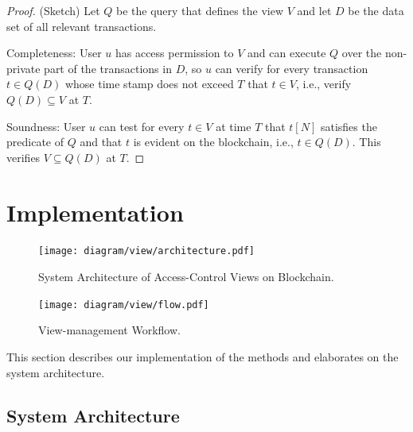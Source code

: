\begin{proof} (Sketch)
Let $Q$ be the query that defines the view $V$ and let $D$ be the data set of all relevant transactions. 

Completeness: User $u$ has access permission to $V$ and can execute $Q$ over the non-private part of the transactions in $D$, so $u$ can verify for every transaction $t\in Q(D)$ whose time stamp does not exceed $T$ that $t\in V$, i.e., verify $Q(D)\subseteq V$ at $T$. 

Soundness: User $u$ can test for every $t\in V$ at time $T$ that $t[N]$ satisfies the predicate of $Q$ and that $t$ is evident on the blockchain, i.e., $t\in Q(D)$. This verifies $V\subseteq Q(D)$ at $T$. 
\end{proof}


\section{Implementation}
\label{ch:view:impl}


\begin{figure}[t]
    \centering
    \texttt{[image: diagram/view/architecture.pdf]}
    \caption{System Architecture of Access-Control Views on Blockchain. }
    \label{diagram:view:impl:architecture}
\end{figure}

\begin{figure}[t]
    \centering
    \texttt{[image: diagram/view/flow.pdf]}
    \caption{View-management Workflow.}
    \label{diagram:view:impl:flow}
\end{figure}
    
    
This section describes our implementation of the methods and elaborates on the system architecture. 

\subsection{System Architecture}
\label{ch:view:impl:overview}

